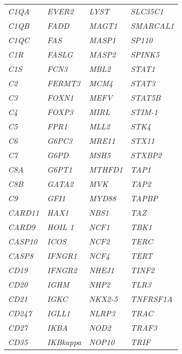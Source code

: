\begin{center}
\begin{spacing}{1.0}
\begin{longtable}{@{}p{3cm}p{3cm}p{3cm}p{3cm}@{}}
    \textit{C1QA} & \textit{EVER2} & \textit{LYST} & \textit{SLC35C1} \\
    \textit{C1QB} & \textit{FADD} & \textit{MAGT1} & \textit{SMARCAL1} \\
    \textit{C1QC} & \textit{FAS} & \textit{MASP1} & \textit{SP110} \\
    \textit{C1R} & \textit{FASLG} & \textit{MASP2} & \textit{SPINK5} \\
    \textit{C1S} & \textit{FCN3} & \textit{MBL2} & \textit{STAT1} \\
    \textit{C2} & \textit{FERMT3} & \textit{MCM4} & \textit{STAT3} \\
    \textit{C3} & \textit{FOXN1} & \textit{MEFV} & \textit{STAT5B} \\
    \textit{C4} & \textit{FOXP3} & \textit{MIRL} & \textit{STIM-1} \\
    \textit{C5} & \textit{FPR1} & \textit{MLL2} & \textit{STK4} \\
    \textit{C6} & \textit{G6PC3} & \textit{MRE11} & \textit{STX11} \\
    \textit{C7} & \textit{G6PD} & \textit{MSH5} & \textit{STXBP2} \\
    \textit{C8A} & \textit{G6PT1} & \textit{MTHFD1} & \textit{TAP1} \\
    \textit{C8B} & \textit{GATA2} & \textit{MVK} & \textit{TAP2} \\
    \textit{C9} & \textit{GFI1} & \textit{MYD88} & \textit{TAPBP} \\
    \textit{CARD11} & \textit{HAX1} & \textit{NBS1} & \textit{TAZ} \\
    \textit{CARD9} & \textit{HOIL 1} & \textit{NCF1} & \textit{TBK1} \\
    \textit{CASP10} & \textit{ICOS} & \textit{NCF2} & \textit{TERC} \\
    \textit{CASP8} & \textit{IFNGR1} & \textit{NCF4} & \textit{TERT} \\
    \textit{CD19} & \textit{IFNGR2} & \textit{NHEJ1} & \textit{TINF2} \\
    \textit{CD20} & \textit{IGHM} & \textit{NHP2} & \textit{TLR3} \\
    \textit{CD21} & \textit{IGKC} & \textit{NKX2-5} & \textit{TNFRSF1A} \\
    \textit{CD247} & \textit{IGLL1} & \textit{NLRP3} & \textit{TRAC} \\
    \textit{CD27} & \textit{IKBA} & \textit{NOD2} & \textit{TRAF3} \\
    \textit{CD35} & \textit{IKBkappa} & \textit{NOP10} & \textit{TRIF} \\

\end{longtable}
\end{spacing}
\end{center}
